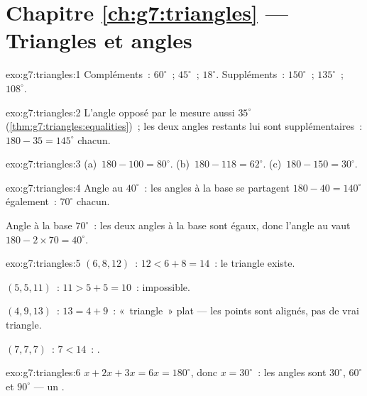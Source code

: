 \section*{Chapitre \ref{ch:g7:triangles} --- Triangles et angles}

\begin{solution}{exo:g7:triangles:1}
Compléments~: $60^\circ$~; $45^\circ$~; $18^\circ$.
Suppléments~: $150^\circ$~; $135^\circ$~; $108^\circ$.
\end{solution}

\begin{solution}{exo:g7:triangles:2}
L'angle opposé par le  mesure aussi $35^\circ$
(\cref{thm:g7:triangles:equalities})~; les deux angles restants lui
sont supplémentaires~: $180 - 35 = 145^\circ$ chacun.
\end{solution}

\begin{solution}{exo:g7:triangles:3}
(a)~$180 - 100 = 80^\circ$. \quad
(b)~$180 - 118 = 62^\circ$. \quad
(c)~$180 - 150 = 30^\circ$.
\end{solution}

\begin{solution}{exo:g7:triangles:4}
Angle au  $40^\circ$~: les angles à la base se partagent
$180 - 40 = 140^\circ$ également~: $70^\circ$ chacun.

Angle à la base $70^\circ$~: les deux angles à la base sont égaux,
donc l'angle au  vaut $180 - 2 \times 70 = 40^\circ$.
\end{solution}

\begin{solution}{exo:g7:triangles:5}
$(6, 8, 12)$~: $12 < 6 + 8 = 14$~: le triangle existe.

$(5, 5, 11)$~: $11 > 5 + 5 = 10$~: impossible.

$(4, 9, 13)$~: $13 = 4 + 9$~: «~triangle~» plat --- les points sont
alignés, pas de vrai triangle.

$(7, 7, 7)$~: $7 < 14$~: .
\end{solution}

\begin{solution}{exo:g7:triangles:6}
$x + 2x + 3x = 6x = 180^\circ$, donc $x = 30^\circ$~: les angles sont
$30^\circ$, $60^\circ$ et $90^\circ$ --- un .
\end{solution}

